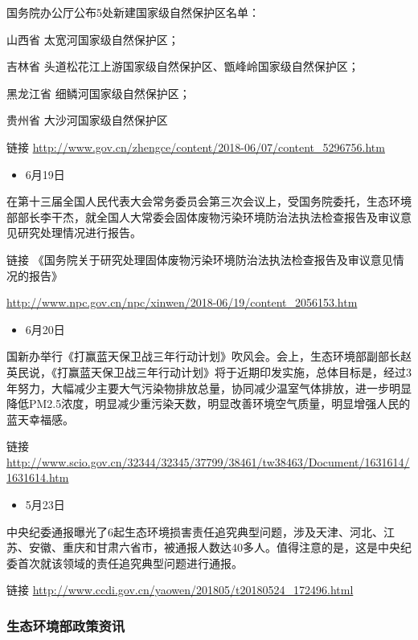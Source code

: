 \documentclass[]{book}
\providecommand{\tightlist}{%
  \setlength{\itemsep}{0pt}\setlength{\parskip}{0pt}}
\begin{document}
国务院办公厅公布5处新建国家级自然保护区名单：

山西省 太宽河国家级自然保护区；

吉林省 头道松花江上游国家级自然保护区、甑峰岭国家级自然保护区；

黑龙江省 细鳞河国家级自然保护区；

贵州省 大沙河国家级自然保护区

链接 \url{http://www.gov.cn/zhengce/content/2018-06/07/content_5296756.htm}

\begin{itemize}
\tightlist
\item
  6月19日
\end{itemize}

在第十三届全国人民代表大会常务委员会第三次会议上，受国务院委托，生态环境部部长李干杰，就全国人大常委会固体废物污染环境防治法执法检查报告及审议意见研究处理情况进行报告。

链接 《国务院关于研究处理固体废物污染环境防治法执法检查报告及审议意见情况的报告》

\url{http://www.npc.gov.cn/npc/xinwen/2018-06/19/content_2056153.htm}

\begin{itemize}
\tightlist
\item
  6月20日
\end{itemize}

国新办举行《打赢蓝天保卫战三年行动计划》吹风会。会上，生态环境部副部长赵英民说，《打赢蓝天保卫战三年行动计划》将于近期印发实施，总体目标是，经过3年努力，大幅减少主要大气污染物排放总量，协同减少温室气体排放，进一步明显降低PM2.5浓度，明显减少重污染天数，明显改善环境空气质量，明显增强人民的蓝天幸福感。

链接 \url{http://www.scio.gov.cn/32344/32345/37799/38461/tw38463/Document/1631614/1631614.htm}

\begin{itemize}
\tightlist
\item
  5月23日
\end{itemize}

中央纪委通报曝光了6起生态环境损害责任追究典型问题，涉及天津、河北、江苏、安徽、重庆和甘肃六省市，被通报人数达40多人。值得注意的是，这是中央纪委首次就该领域的责任追究典型问题进行通报。

链接 \url{http://www.ccdi.gov.cn/yaowen/201805/t20180524_172496.html}

\hypertarget{ux751fux6001ux73afux5883ux90e8ux653fux7b56ux8d44ux8baf-2}{%
\subsubsection*{生态环境部政策资讯}\label{ux751fux6001ux73afux5883ux90e8ux653fux7b56ux8d44ux8baf-2}}
\end{document}
